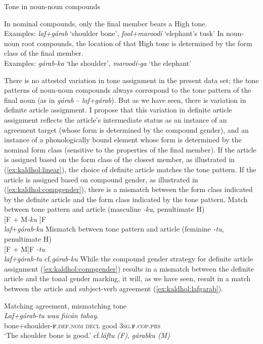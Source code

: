 \documentclass[output=paper]{langscibook}
\begin{document}
\ea\label{ex:kaldhol:tone}
	Tone in noun-noun compounds
	\begin{xlist}
		\ex
		In nominal compounds, only the final member bears a High tone.\\
		Examples: \textit{laf+gárab} `shoulder bone', \textit{fool+maroodí} `elephant's tusk'
		\ex
		In noun-noun root compounds, the location of that High tone is determined by the form class of the final member.\\
		Examples: \textit{gárab-ka} `the shoulder', \textit{maroodí-ga} `the elephant'
	\end{xlist}
\z
There is no attested variation in tone assignment in the present data set; the tone patterns of noun-noun compounds always correspond to the tone pattern of the final noun (as in \textit{gárab} -- \textit{laf+gárab}). But as we have seen, there is variation in definite article assignment. I propose that this variation in definite article assignment reflects the article's intermediate status as an instance of an agreement target (whose form is determined by the compound gender), and an instance of a phonologically bound element whose form is determined by the nominal form class (sensitive to the properties of the final member).  If the article is assigned based on the form class of the closest member, as illustrated in (\ref{ex:kaldhol:linear}), the choice of definite article matches the tone pattern. If the article is assigned based on compound gender, as illustrated in (\ref{ex:kaldhol:compgender}), there is a mismatch between the form class indicated by the definite article and the form class indicated by the tone pattern.
\ea\label{ex:kaldhol:linear}
	Match between tone pattern and article (masculine \textit{-ku}, penultimate H)\\
	{[}F + M\textit{-ku} ]F\\
	\textit{laf}+\textit{gárab-ku}
	\ex\label{ex:kaldhol:compgender}
	Mismatch between tone pattern and article (feminine \textit{-tu}, penultimate H)\\
	{[}F + M]F \textit{-tu} \\
	\textit{laf+gárab-tu} \hfill{cf.\@ \textit{gárab-ku}}
\z
While the compound gender strategy for definite article assignment (\ref{ex:kaldhol:compgender}) results in a mismatch between the definite article and the tonal gender marking, it will, as we have seen, result in a match between the article and subject-verb agreement (\ref{ex:kaldhol:lafgarab}).

\ea\label{ex:kaldhol:lafgarab}
	Matching agreement, mismatching tone\\
	\gll \textit{Laf+gárab-tu} \textit{waa} \textit{fiicán} \textit{tahay}.\\
	bone+shoulder-\textsc{\textbf{f}.def.nom} \textsc{decl} good \textsc{3sg.\textbf{f}}.\textsc{cop.prs}\\
	\glt`The shoulder bone is good.' \hfill cf.\@ \textit{láftu (F)}, \textit{gárabku (M)}
\z
\end{document}
